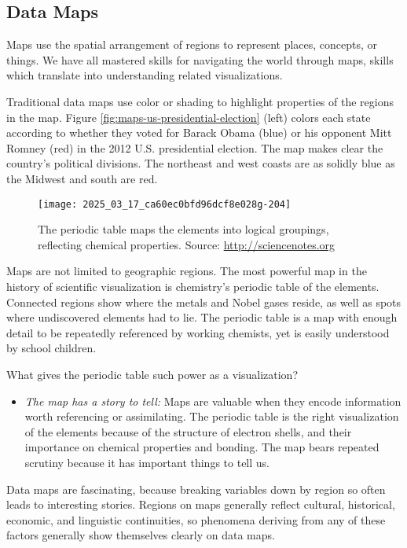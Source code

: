 \documentclass[10pt]{article}
\begin{document}
\subsection*{Data Maps}
Maps use the spatial arrangement of regions to represent places, concepts, or things. We have all mastered skills for navigating the world through maps, skills which translate into understanding related visualizations.

Traditional data maps use color or shading to highlight properties of the regions in the map. Figure \ref{fig:maps-us-presidential-election} (left) colors each state according to whether they voted for Barack Obama (blue) or his opponent Mitt Romney (red) in the 2012 U.S. presidential election. The map makes clear the country's political divisions. The northeast and west coasts are as solidly blue as the Midwest and south are red.

\begin{figure}[H]
    \centering
    \texttt{[image: 2025\_03\_17\_ca60ec0bfd96dcf8e028g-204]}
    \caption{The periodic table maps the elements into logical groupings, reflecting chemical properties. Source: \href{http://sciencenotes.org}{http://sciencenotes.org}}
    \label{fig:periodic-table}
\end{figure}

Maps are not limited to geographic regions. The most powerful map in the history of scientific visualization is chemistry's periodic table of the elements. Connected regions show where the metals and Nobel gases reside, as well as spots where undiscovered elements had to lie. The periodic table is a map with enough detail to be repeatedly referenced by working chemists, yet is easily understood by school children.

What gives the periodic table such power as a visualization?

\begin{itemize}
    \item \textit{The map has a story to tell:} Maps are valuable when they encode information worth referencing or assimilating. The periodic table is the right visualization of the elements because of the structure of electron shells, and their importance on chemical properties and bonding. The map bears repeated scrutiny because it has important things to tell us.
\end{itemize}

Data maps are fascinating, because breaking variables down by region so often leads to interesting stories. Regions on maps generally reflect cultural, historical, economic, and linguistic continuities, so phenomena deriving from any of these factors generally show themselves clearly on data maps.
\end{document}
